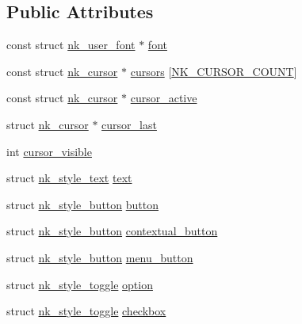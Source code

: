 \subsection*{Public Attributes}
\begin{DoxyCompactItemize}
\item 
const struct \mbox{\hyperlink{structnk__user__font}{nk\+\_\+user\+\_\+font}} $\ast$ \mbox{\hyperlink{structnk__style_aab136e535cc1d11d40e8b2fd18060c5d}{font}}
\item 
const struct \mbox{\hyperlink{structnk__cursor}{nk\+\_\+cursor}} $\ast$ \mbox{\hyperlink{structnk__style_aba31682e1e6dba96e52fcbdb750be34c}{cursors}} \mbox{[}\mbox{\hyperlink{nuklear_8h_ac83d70db962be55fde890e491d190213a87299462a55125531df5f9aa8c99fadf}{N\+K\+\_\+\+C\+U\+R\+S\+O\+R\+\_\+\+C\+O\+U\+NT}}\mbox{]}
\item 
const struct \mbox{\hyperlink{structnk__cursor}{nk\+\_\+cursor}} $\ast$ \mbox{\hyperlink{structnk__style_ac9b1221879c981b2afc829e819aaee5a}{cursor\+\_\+active}}
\item 
struct \mbox{\hyperlink{structnk__cursor}{nk\+\_\+cursor}} $\ast$ \mbox{\hyperlink{structnk__style_a90fbf5f270f36ec466bef6a0591fb37b}{cursor\+\_\+last}}
\item 
int \mbox{\hyperlink{structnk__style_a9ee1b418ab830430d317d9a4e06f4f98}{cursor\+\_\+visible}}
\item 
struct \mbox{\hyperlink{structnk__style__text}{nk\+\_\+style\+\_\+text}} \mbox{\hyperlink{structnk__style_a3a84db8a7418bf259f60be1d10bd54ed}{text}}
\item 
struct \mbox{\hyperlink{structnk__style__button}{nk\+\_\+style\+\_\+button}} \mbox{\hyperlink{structnk__style_a42b97653cc5b81ff97432e40fdf47026}{button}}
\item 
struct \mbox{\hyperlink{structnk__style__button}{nk\+\_\+style\+\_\+button}} \mbox{\hyperlink{structnk__style_a22d7362fed90d872bca7e51c3281d10b}{contextual\+\_\+button}}
\item 
struct \mbox{\hyperlink{structnk__style__button}{nk\+\_\+style\+\_\+button}} \mbox{\hyperlink{structnk__style_af26de9bbb7b4c8a9bd3e722ae41b6433}{menu\+\_\+button}}
\item 
struct \mbox{\hyperlink{structnk__style__toggle}{nk\+\_\+style\+\_\+toggle}} \mbox{\hyperlink{structnk__style_a12e31b1eff50ff00fc327325ce6cd7f9}{option}}
\item 
struct \mbox{\hyperlink{structnk__style__toggle}{nk\+\_\+style\+\_\+toggle}} \mbox{\hyperlink{structnk__style_af3bd1c9f26bcdc34deeea5afe005b4ee}{checkbox}}

\end{DoxyCompactItemize}
